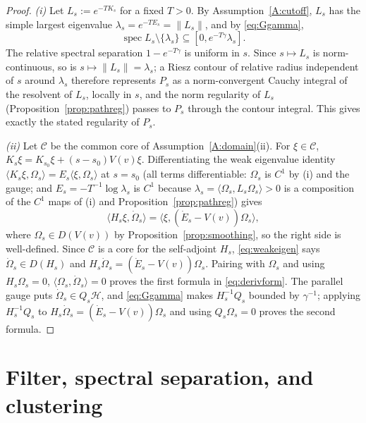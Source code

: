 \documentclass[11pt,a4paper]{article}
\theoremstyle{plain}
\theoremstyle{definition}
\theoremstyle{plain}
\theoremstyle{definition}
\newcommand{\HH}{\mathcal{H}}
\newcommand{\Om}{\Omega}
\newcommand{\ip}[2]{\langle #1,#2\rangle}
\DeclareMathOperator{\spec}{spec}
\begin{document}
\begin{proof}
\emph{(i)} Let $L_s:=e^{-TK_s}$ for a fixed $T>0$. By Assumption~\ref{A:cutoff}, $L_s$ has
the simple largest eigenvalue $\lambda_s=e^{-TE_s}=\|L_s\|$, and by \eqref{eq:Ggamma},
\[
 \spec L_s\setminus\{\lambda_s\}\subseteq[0,e^{-T\gamma}\lambda_s] .
\]
The relative spectral separation $1-e^{-T\gamma}$ is uniform in $s$. Since $s\mapsto L_s$
is norm-continuous, so is $s\mapsto\|L_s\|=\lambda_s$; a Riesz contour of relative radius
independent of $s$ around $\lambda_s$ therefore represents $P_s$ as a norm-convergent
Cauchy integral of the resolvent of $L_s$, locally in $s$, and the norm regularity of
$L_s$ (Proposition~\ref{prop:pathreg}) passes to $P_s$ through the contour integral. This
gives exactly the stated regularity of $P_s$.

\emph{(ii)} Let $\mathscr C$ be the common core of Assumption~\ref{A:domain}(ii). For
$\xi\in\mathscr C$, $K_s\xi=K_{s_0}\xi+(s-s_0)V(v)\xi$. Differentiating the weak
eigenvalue identity $\ip{K_s\xi}{\Om_s}=E_s\ip{\xi}{\Om_s}$ at $s=s_0$ (all terms
differentiable: $\Om_s$ is $C^1$ by (i) and the gauge; and
$E_s=-T^{-1}\log\lambda_s$ is $C^1$ because
$\lambda_s=\ip{\Om_s}{L_s\Om_s}>0$ is a composition of the $C^1$ maps of (i) and
Proposition~\ref{prop:pathreg}) gives
\begin{equation}
 \ip{H_s\xi}{\dot\Om_s}=\ip{\xi}{(\dot E_s-V(v))\Om_s} ,
 \label{eq:weakeigen}
\end{equation}
where $\Om_s\in D(V(v))$ by Proposition~\ref{prop:smoothing}, so the right side is
well-defined. Since $\mathscr C$ is a core for the self-adjoint $H_s$,
\eqref{eq:weakeigen} says $\dot\Om_s\in D(H_s)$ and
$H_s\dot\Om_s=(\dot E_s-V(v))\Om_s$. Pairing with $\Om_s$ and using
$H_s\Om_s=0$, $\ip{\Om_s}{\dot\Om_s}=0$ proves the first formula in
\eqref{eq:derivform}. The parallel gauge puts $\dot\Om_s\in Q_s\HH$, and \eqref{eq:Ggamma}
makes $H_s^{-1}Q_s$ bounded by $\gamma^{-1}$; applying $H_s^{-1}Q_s$ to
$H_s\dot\Om_s=(\dot E_s-V(v))\Om_s$ and using $Q_s\Om_s=0$ proves the second formula.
\end{proof}

\section{Filter, spectral separation, and clustering}\label{sec:filter}
\end{document}
